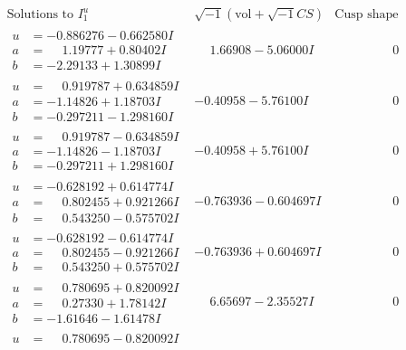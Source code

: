 \documentclass[1p]{elsarticle_modified}
\theoremstyle{definition}
\newcommand{\I}{\sqrt{-1}}
\begin{document}
$$\begin{array}{c|c|c}
\text{Solutions to }I^u_{1}& \I (\text{vol} + \sqrt{-1}CS) & \text{Cusp shape}\\
 \hline 
\begin{aligned}
u &= -0.886276 - 0.662580 I \\
a &= \phantom{-}1.19777 + 0.80402 I \\
b &= -2.29133 + 1.30899 I\end{aligned}
 & \phantom{-}1.66908 - 5.06000 I & \phantom{-0.000000 } 0 \\ \hline\begin{aligned}
u &= \phantom{-}0.919787 + 0.634859 I \\
a &= -1.14826 + 1.18703 I \\
b &= -0.297211 - 1.298160 I\end{aligned}
 & -0.40958 - 5.76100 I & \phantom{-0.000000 } 0 \\ \hline\begin{aligned}
u &= \phantom{-}0.919787 - 0.634859 I \\
a &= -1.14826 - 1.18703 I \\
b &= -0.297211 + 1.298160 I\end{aligned}
 & -0.40958 + 5.76100 I & \phantom{-0.000000 } 0 \\ \hline\begin{aligned}
u &= -0.628192 + 0.614774 I \\
a &= \phantom{-}0.802455 + 0.921266 I \\
b &= \phantom{-}0.543250 - 0.575702 I\end{aligned}
 & -0.763936 - 0.604697 I & \phantom{-0.000000 } 0 \\ \hline\begin{aligned}
u &= -0.628192 - 0.614774 I \\
a &= \phantom{-}0.802455 - 0.921266 I \\
b &= \phantom{-}0.543250 + 0.575702 I\end{aligned}
 & -0.763936 + 0.604697 I & \phantom{-0.000000 } 0 \\ \hline\begin{aligned}
u &= \phantom{-}0.780695 + 0.820092 I \\
a &= \phantom{-}0.27330 + 1.78142 I \\
b &= -1.61646 - 1.61478 I\end{aligned}
 & \phantom{-}6.65697 - 2.35527 I & \phantom{-0.000000 } 0 \\ \hline\begin{aligned}
u &= \phantom{-}0.780695 - 0.820092 I \\

\end{aligned}
\end{array}$$
\end{document}
